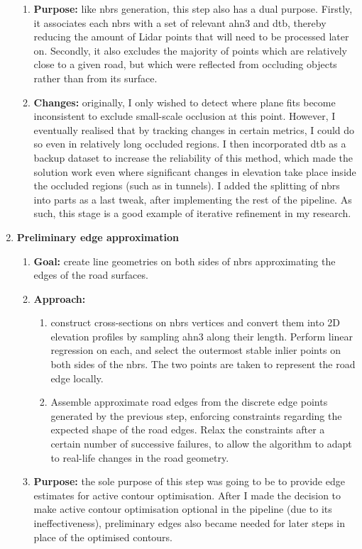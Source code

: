 \begin{enumerate}
\begin{enumerate}
        \item \textbf{Purpose:} like \ac{nbrs} generation, this step also has a dual purpose. Firstly, it associates each \ac{nbrs} with a set of relevant \ac{ahn3} and \ac{dtb}, thereby reducing the amount of Lidar points that will need to be processed later on. Secondly, it also excludes the majority of points which are relatively close to a given road, but which were reflected from occluding objects rather than from its surface.
        \item \textbf{Changes:} originally, I only wished to detect where plane fits become inconsistent to exclude small-scale occlusion at this point. However, I eventually realised that by tracking changes in certain metrics, I could do so even in relatively long occluded regions. I then incorporated \ac{dtb} as a backup dataset to increase the reliability of this method, which made the solution work even where significant changes in elevation take place inside the occluded regions (such as in tunnels). I added the splitting of \ac{nbrs} into parts as a last tweak, after implementing the rest of the pipeline. As such, this stage is a good example of iterative refinement in my research.
    \end{enumerate}
    \item \textbf{Preliminary edge approximation}
    \begin{enumerate}
        \item \textbf{Goal:} create line geometries on both sides of \ac{nbrs} approximating the edges of the road surfaces.
        \item \textbf{Approach:}
        \begin{enumerate}
            \item construct cross-sections on \ac{nbrs} vertices and convert them into 2D elevation profiles by sampling \ac{ahn3} along their length. Perform linear regression on each, and select the outermost stable inlier points on both sides of the \ac{nbrs}. The two points are taken to represent the road edge locally.
            \item Assemble approximate road edges from the discrete edge points generated by the previous step, enforcing constraints regarding the expected shape of the road edges. Relax the constraints after a certain number of successive failures, to allow the algorithm to adapt to real-life changes in the road geometry.
        \end{enumerate}
        \item \textbf{Purpose:} the sole purpose of this step was going to be to provide edge estimates for active contour optimisation. After I made the decision to make active contour optimisation optional in the pipeline (due to its ineffectiveness), preliminary edges also became needed for later steps in place of the optimised contours.

\end{enumerate}
\end{enumerate}

